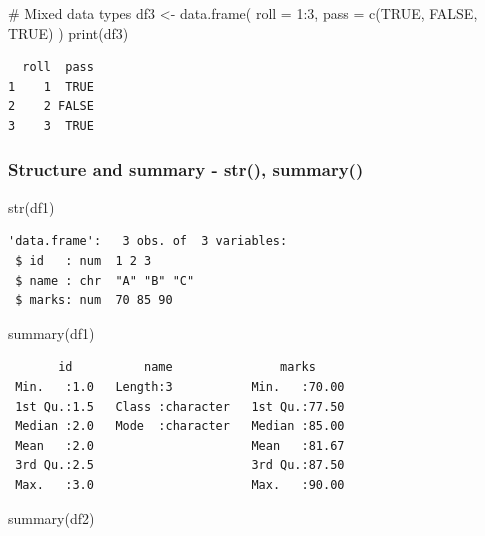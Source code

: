 \documentclass[
  letterpaper,
  DIV=11,
  numbers=noendperiod]{scrartcl}
\newenvironment{Shaded}{\begin{snugshade}}{\end{snugshade}}
\newcommand{\AttributeTok}[1]{\textcolor[rgb]{0.40,0.45,0.13}{#1}}
\newcommand{\CommentTok}[1]{\textcolor[rgb]{0.37,0.37,0.37}{#1}}
\newcommand{\ConstantTok}[1]{\textcolor[rgb]{0.56,0.35,0.01}{#1}}
\newcommand{\DecValTok}[1]{\textcolor[rgb]{0.68,0.00,0.00}{#1}}
\newcommand{\FunctionTok}[1]{\textcolor[rgb]{0.28,0.35,0.67}{#1}}
\newcommand{\NormalTok}[1]{\textcolor[rgb]{0.00,0.23,0.31}{#1}}
\newcommand{\OtherTok}[1]{\textcolor[rgb]{0.00,0.23,0.31}{#1}}
\newcommand{\SpecialCharTok}[1]{\textcolor[rgb]{0.37,0.37,0.37}{#1}}
\begin{document}
\begin{Shaded}
\begin{Highlighting}[]
\CommentTok{\# Mixed data types}
\NormalTok{df3 }\OtherTok{\textless{}{-}} \FunctionTok{data.frame}\NormalTok{(}
  \AttributeTok{roll =} \DecValTok{1}\SpecialCharTok{:}\DecValTok{3}\NormalTok{,}
  \AttributeTok{pass =} \FunctionTok{c}\NormalTok{(}\ConstantTok{TRUE}\NormalTok{, }\ConstantTok{FALSE}\NormalTok{, }\ConstantTok{TRUE}\NormalTok{)}
\NormalTok{)}
\FunctionTok{print}\NormalTok{(df3)}
\end{Highlighting}
\end{Shaded}

\begin{verbatim}
  roll  pass
1    1  TRUE
2    2 FALSE
3    3  TRUE
\end{verbatim}

\subsubsection{Structure and summary - str(),
summary()}\label{structure-and-summary---str-summary}

\begin{Shaded}
\begin{Highlighting}[]
\FunctionTok{str}\NormalTok{(df1)}
\end{Highlighting}
\end{Shaded}

\begin{verbatim}
'data.frame':   3 obs. of  3 variables:
 $ id   : num  1 2 3
 $ name : chr  "A" "B" "C"
 $ marks: num  70 85 90
\end{verbatim}

\begin{Shaded}
\begin{Highlighting}[]
\FunctionTok{summary}\NormalTok{(df1)}
\end{Highlighting}
\end{Shaded}

\begin{verbatim}
       id          name               marks      
 Min.   :1.0   Length:3           Min.   :70.00  
 1st Qu.:1.5   Class :character   1st Qu.:77.50  
 Median :2.0   Mode  :character   Median :85.00  
 Mean   :2.0                      Mean   :81.67  
 3rd Qu.:2.5                      3rd Qu.:87.50  
 Max.   :3.0                      Max.   :90.00  
\end{verbatim}

\begin{Shaded}
\begin{Highlighting}[]
\FunctionTok{summary}\NormalTok{(df2)}
\end{Highlighting}
\end{Shaded}
\end{document}
